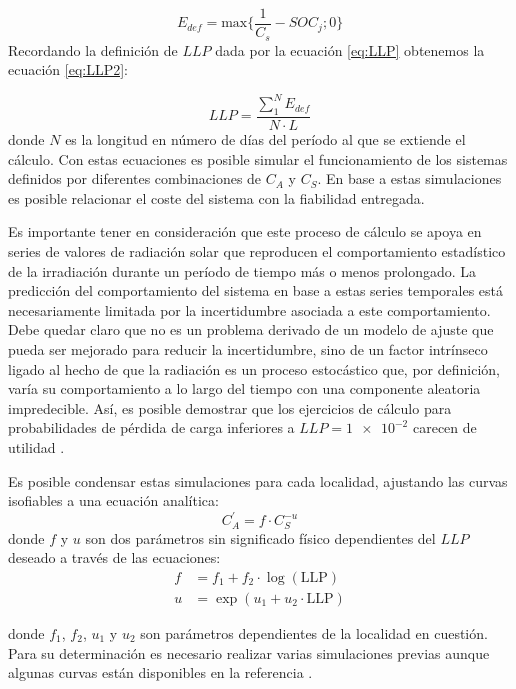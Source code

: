 \begin{equation}
E_{def}=\mathrm{max}\{\frac{1}{C_{s}}-SOC_{j};0\}\label{eq:Edef}\end{equation}
Recordando la definición de $LLP$ dada por la ecuación \ref{eq:LLP}
obtenemos la ecuación \ref{eq:LLP2}:

\begin{equation}
LLP=\frac{\sum_{1}^{N}E_{def}}{N\cdot L}\label{eq:LLP2}\end{equation}
donde $N$ es la longitud en número de días del período al que se
extiende el cálculo. Con estas ecuaciones es posible simular el funcionamiento
de los sistemas definidos por diferentes combinaciones de $C_{A}$
y $C_{S}$. En base a estas simulaciones es posible relacionar el
coste del sistema con la fiabilidad entregada. 

Es importante tener en consideración que este proceso de cálculo se
apoya en series de valores de radiación solar que reproducen el comportamiento
estadístico de la irradiación durante un período de tiempo más o menos
prolongado. La predicción del comportamiento del sistema en base a
estas series temporales está necesariamente limitada por la incertidumbre
asociada a este comportamiento. Debe quedar claro que no es un problema
derivado de un modelo de ajuste que pueda ser mejorado para reducir
la incertidumbre, sino de un factor intrínseco ligado al hecho de
que la radiación es un proceso estocástico que, por definición, varía
su comportamiento a lo largo del tiempo con una componente aleatoria
impredecible. Así, es posible demostrar que los ejercicios de cálculo
para probabilidades de pérdida de carga inferiores a $LLP=\num{1e-2}$
carecen de utilidad \citep{Narvarte2001}.

Es posible condensar estas simulaciones para cada localidad, ajustando
las curvas isofiables a una ecuación analítica:
\begin{equation}
C_{A}^{'} = f\cdot C_{S}^{-u}
\end{equation}
donde $f$ y $u$ son dos parámetros sin significado físico dependientes
del $LLP$ deseado a través de las ecuaciones:
\begin{align}
  f &= f_1 + f_2 \cdot \log(\mathrm{LLP}) \\
  u &= \exp(u_1+u_2 \cdot \mathrm{LLP})
\end{align}

donde $f_1$, $f_2$, $u_1$ y $u_2$ son parámetros dependientes de la
localidad en cuestión. Para su determinación es necesario
realizar varias simulaciones previas aunque algunas curvas están disponibles
en la referencia \citep{Egido.Lorenzo1992}. 

